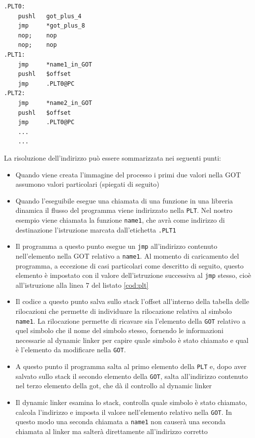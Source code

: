 \begin{lstlisting}[caption=Procedure linkage table, label=cod:plt]
.PLT0:
    pushl   got_plus_4
    jmp     *got_plus_8
    nop;    nop
    nop;    nop
.PLT1:
    jmp     *name1_in_GOT
    pushl   $offset
    jmp     .PLT0@PC
.PLT2:
    jmp     *name2_in_GOT
    pushl   $offset
    jmp     .PLT0@PC
    ...
    ...
\end{lstlisting}

La risoluzione dell'indirizzo può essere sommarizzata nei seguenti
punti:

\begin{itemize}
\item Quando viene creata l'immagine del processo i primi due valori
  nella GOT assumono valori particolari (spiegati di seguito)
\item Quando l'eseguibile esegue una chiamata di una funzione in una
  libreria dinamica il flusso del programma viene indirizzato nella
  \lstinline{PLT}. Nel nostro esempio viene chiamata la funzione
  \lstinline{name1}, che avrà come indirizzo di destinazione
  l'istruzione marcata dall'etichetta \lstinline{.PLT1}
\item Il programma a questo punto esegue un \lstinline{jmp}
  all'indirizzo contenuto nell'elemento nella GOT relativo a
  \lstinline{name1}. Al momento di caricamento del programma, a
  eccezione di casi particolari come descritto di seguito, questo
  elemento è impostato con il valore dell'istruzione successiva al
  \lstinline{jmp} stesso, cioè all'istruzione alla linea 7 del listato
  \ref{cod:plt}
\item Il codice a questo punto salva sullo stack l'offset all'interno
  della tabella delle rilocazioni che permette di individuare la
  rilocazione relativa al simbolo \lstinline{name1}. La rilocazione
  permette di ricavare sia l'elemento della \lstinline{GOT} relativo a
  quel simbolo che il nome del simbolo stesso, fornendo le
  informazioni necessarie al dynamic linker per capire quale simbolo è
  stato chiamato e qual è l'elemento da modificare nella
  \lstinline{GOT}.
\item A questo punto il programma salta al primo elemento della
  \lstinline{PLT} e, dopo aver salvato sullo stack il secondo elemento
  della \lstinline{GOT}, salta all'indirizzo contenuto nel terzo
  elemento della got, che dà il controllo al dynamic linker
\item Il dynamic linker esamina lo stack, controlla quale simbolo è
  stato chiamato, calcola l'indirizzo e imposta il valore
  nell'elemento relativo nella \lstinline{GOT}. In questo modo una
  seconda chiamata a \lstinline{name1} non causerà una seconda
  chiamata al linker ma salterà direttamente all'indirizzo corretto
\end{itemize}

